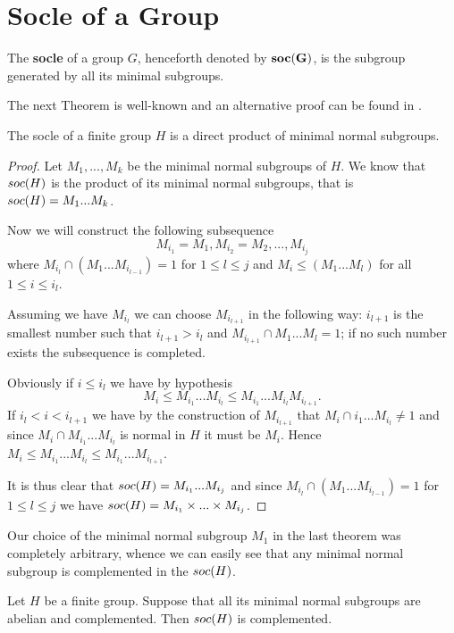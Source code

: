 \section{Socle of a Group}

\begin{definition}
    The \textbf{socle} of a group $G$, henceforth denoted by $\mathbf{soc {(G)}}$, is the subgroup generated by all its minimal subgroups.
\end{definition}

The next Theorem is well-known and an alternative proof can be found in \cite[p.~87]{RobinsonCTG}. 
\begin{theorem}
    The socle of a finite group $H$ is a direct product of minimal normal subgroups.
\end{theorem}

\begin{proof}
    Let $M_1,...,M_k$ be the minimal normal subgroups of $H$. We know that $soc {(H)}$ is the product of its minimal normal subgroups, that is $soc {(H)} = M_1...M_k$.

    Now we will construct the following subsequence $$M_{i_1} = M_1, M_{i_2} = M_2, ..., M_{i_j}$$ where $M_{i_l} \cap (M_1...M_{i_{l-1}}) = 1$ for $1 \le l \le j$ and $M_i \le (M_1...M_{l})$ for all $1 \le i \le i_l$.

    Assuming we have $M_{i_l}$ we can choose $M_{i_{l+1}}$ in the following way: $i_{l+1}$ is the smallest number such that $i_{l+1} > i_l$ and $M_{i_{l+1}} \cap M_1...M_l = 1$; if no such number exists the subsequence is completed.

    Obviously if $i \le i_l$ we have by hypothesis 
    $$
    M_i \le M_{i_1}...M_{i_l} \le M_{i_1}...M_{i_l}M_{i_{l+1}}.
    $$ 
    If $i_l < i < i_{l+1}$ we have by the construction of $M_{i_{l+1}}$ that $M_i \cap {i_1}...M_{i_l} \ne 1$ and since $M_i \cap M_{i_1}...M_{i_l}$ is normal in $H$ it must be $M_i$. Hence $M_i \le M_{i_1}...M_{i_l} \le M_{i_1}...M_{i_{l+1}}$.

    It is thus clear that $soc {(H)} = M_{i_1}...M_{i_j}$ and since $M_{i_l} \cap (M_1...M_{i_{l-1}}) = 1$ for $1 \le l \le j$ we have $soc {(H)} = M_{i_1}\times ... \times M_{i_j}$.
\end{proof}

 Our choice of the minimal normal subgroup $M_1$ in the last theorem was completely arbitrary, whence we can easily see that any minimal normal subgroup is complemented in the $soc {(H)}$.

 \begin{theorem}
    \label{th:SocC}
    Let $H$ be a finite group. Suppose that all its minimal normal subgroups are abelian and complemented. Then $soc {(H)}$ is complemented.
\end{theorem}


